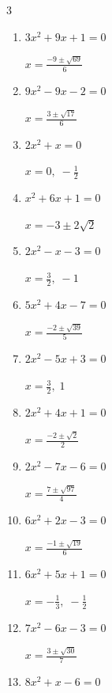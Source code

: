 \begin{multicols}{3}
\begin{enumerate}
        $\displaystyle x=\pm 2\sqrt{2}$

  \item $3x^{2}+9x+1=0$

        $\displaystyle x=\frac{-9\pm \sqrt{69}}{6}$

  \item $9x^{2}-9x-2=0$

        $\displaystyle x=\frac{3\pm \sqrt{17}}{6}$

\columnbreak %

  \item $2x^{2}+x=0$

        $\displaystyle x=0, \; -\frac{1}{2}$

  \item $x^{2}+6x+1=0$

        $\displaystyle x=-3\pm 2\sqrt{2}$

  \item $2x^{2}-x-3=0$

        $\displaystyle x=\frac{3}{2}, \; -1$

  \item $5x^{2}+4x-7=0$

        $\displaystyle x=\frac{-2\pm \sqrt{39}}{5}$

  \item $2x^{2}-5x+3=0$

        $\displaystyle x=\frac{3}{2}, \; 1$

  \item $2x^{2}+4x+1=0$

        $\displaystyle x=\frac{-2\pm \sqrt{2}}{2}$

  \item $2x^{2}-7x-6=0$

        $\displaystyle x=\frac{7\pm \sqrt{97}}{4}$

\columnbreak %

\resetques

  \item $6x^{2}+2x-3=0$

        $\displaystyle x=\frac{-1\pm \sqrt{19}}{6}$

  \item $6x^{2}+5x+1=0$

        $\displaystyle x=-\frac{1}{3}, \; -\frac{1}{2}$

  \item $7x^{2}-6x-3=0$

        $\displaystyle x=\frac{3\pm \sqrt{30}}{7}$

  \item $8x^{2}+x-6=0$


\end{enumerate}
\end{multicols}
